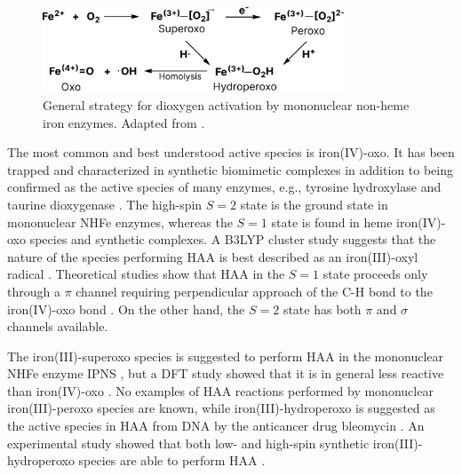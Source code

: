 \begin{figure}[htbp]
    \centering
    \includegraphics[width=0.8\textwidth]{Figures/Dioxygen_NHFe.pdf}
    \caption{General strategy for dioxygen activation by mononuclear non-heme iron enzymes. Adapted from \cite{Ray2014}.}
    \label{fig:NHFe_O2}
\end{figure}

The most common and best understood active species is iron(IV)-oxo. It has been trapped and characterized in synthetic biomimetic complexes \cite{Visser2013} in addition to being confirmed as the active species of many enzymes, e.g., tyrosine hydroxylase \cite{Eser2007} and taurine dioxygenase \cite{Gelasco2004}. The high-spin $S=2$ state is the ground state in mononuclear NHFe enzymes, whereas the $S=1$ state is found in heme iron(IV)-oxo species and synthetic complexes. A B3LYP cluster study suggests that the nature of the species performing HAA is best described as an iron(III)-oxyl radical \cite{Ye2011}. Theoretical studies show that HAA in the $S=1$ state proceeds only through a $\pi$ channel requiring perpendicular approach of the C-H bond to the iron(IV)-oxo bond \cite{Decker2007}. On the other hand, the $S=2$ state has both $\pi$ and $\sigma$ channels available.  

The iron(III)-superoxo species is suggested to perform HAA in the mononuclear NHFe enzyme IPNS \cite{Brown2007}, but a DFT study showed that it is in general less reactive than iron(IV)-oxo \cite{Chung2011}. No examples of HAA reactions performed by mononuclear iron(III)-peroxo species are known, while iron(III)-hydroperoxo is suggested as the active species in HAA from DNA by the anticancer drug bleomycin \cite{Chow2008}. An experimental study showed that both low- and high-spin synthetic iron(III)-hydroperoxo species are able to perform HAA \cite{Liu2013}.
 

